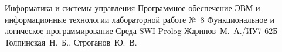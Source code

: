 \documentclass[a4paper,oneside,14pt]{extarticle}
\begin{document}
\makereporttitle
{Информатика и системы управления} %
{Программное обеспечение ЭВМ и информационные технологии} %
{лабораторной работе №~8} %
{Функциональное и логическое программирование} %
{Среда SWI Prolog} %
{} %
{Жаринов~М.~А./ИУ7-62Б} %
{Толпинская~Н.~Б., Строганов~Ю.~В.} %

\setcounter{page}{2}

\renewcommand{\contentsname}{СОДЕРЖАНИЕ}
\tableofcontents

% 
% 



% 
\end{document}
